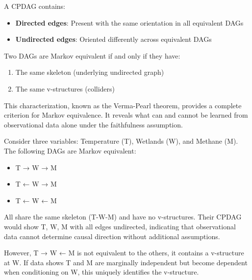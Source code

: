 A CPDAG contains:
\begin{itemize}
\item \textbf{Directed edges}: Present with the same orientation in all equivalent DAGs
\item \textbf{Undirected edges}: Oriented differently across equivalent DAGs
\end{itemize}

Two DAGs are Markov equivalent if and only if they have:
\begin{enumerate}
\item The same skeleton (underlying undirected graph)
\item The same v-structures (colliders)
\end{enumerate}

This characterization, known as the Verma-Pearl theorem, provides a complete criterion for Markov equivalence. It reveals what can and cannot be learned from observational data alone under the faithfulness assumption.

Consider three variables: Temperature (T), Wetlands (W), and Methane (M). The following DAGs are Markov equivalent:
\begin{itemize}
\item T → W → M
\item T ← W → M  
\item T ← W ← M
\end{itemize}

All share the same skeleton (T-W-M) and have no v-structures. Their CPDAG would show T, W, M with all edges undirected, indicating that observational data cannot determine causal direction without additional assumptions.

However, T → W ← M is not equivalent to the others, it contains a v-structure at W. If data shows T and M are marginally independent but become dependent when conditioning on W, this uniquely identifies the v-structure.

